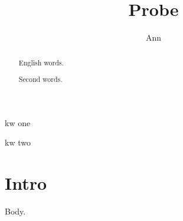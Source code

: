 \documentclass{IEEEtran}
\begin{document}
\title{Probe}\author{Ann}\maketitle
\begin{abstract}English words.\end{abstract}
\begin{IEEEkeywords}kw one\end{IEEEkeywords}
\begin{abstract}Second words.\end{abstract}
\begin{IEEEkeywords}kw two\end{IEEEkeywords}
\section{Intro}Body.
\end{document}
